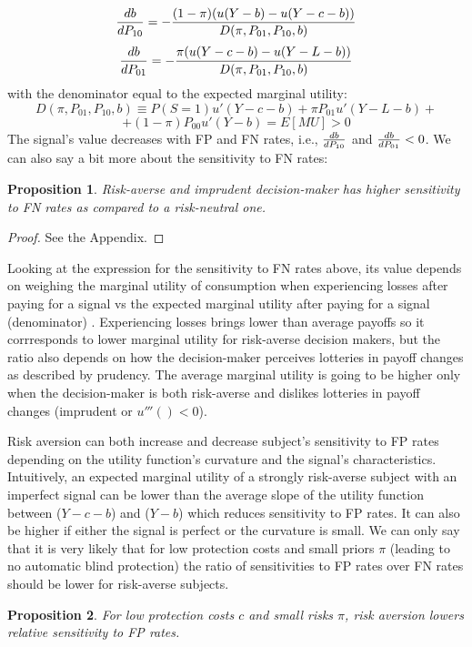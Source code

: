 \documentclass[12pt,a4paper]{article}
\newtheorem{theorem}{Proposition}
\begin{document}
$${db\over dP_{10}}=-{(1-\pi)(u(Y-b)-u(Y-c-b))\over D(\pi, P_{01}, P_{10}, b)}$$
$${db\over dP_{01}}=-{\pi(u(Y-c-b)-u(Y-L-b))\over D(\pi, P_{01}, P_{10}, b)}$$
with the denominator equal to the expected marginal utility:
$$D(\pi, P_{01}, P_{10}, b)\equiv P(S=1)u'(Y-c-b)+\pi P_{01}u'(Y-L-b)+$$
$$+(1-\pi)P_{00}u'(Y-b)=E[MU]>0$$
The signal's value decreases with FP and FN rates, i.e., ${db\over dP_{10}}$ and ${db\over dP_{01}}<0$. We can also say a bit more about the sensitivity to FN rates:
\begin{theorem}
Risk-averse and imprudent decision-maker has higher sensitivity to FN rates as compared to a risk-neutral one.
\end{theorem}\label{thm:riskAverse}  
\begin{proof}
See the Appendix.
\end{proof}
Looking at the expression for the sensitivity to FN rates above, its value depends on weighing the marginal utility of consumption when experiencing losses after paying for a signal vs the expected marginal utility after paying for a signal (denominator) . Experiencing losses brings lower than average payoffs so it corrresponds to lower marginal utility for risk-averse decision makers, but the ratio also depends on how the decision-maker perceives lotteries in payoff changes as described by prudency. The average marginal utility is going to be higher only when the decision-maker is both risk-averse and dislikes lotteries in payoff changes (imprudent or $u'''()<0$). 

Risk aversion can both increase and decrease subject's sensitivity to FP rates depending on the utility function's curvature and the signal's characteristics. Intuitively, an expected marginal utility of a strongly risk-averse subject with an imperfect signal can be lower than the average slope of the utility function between ($Y-c-b$) and ($Y-b$) which reduces sensitivity to FP rates. It can also be higher if either the signal is perfect or the curvature is small. We can only say that it is very likely that for low protection costs and small priors $\pi$ (leading to no automatic blind protection) the ratio of sensitivities to FP rates over FN rates should be lower for risk-averse subjects. 

\begin{theorem}
For low protection costs $c$ and small risks $\pi$, risk aversion lowers relative sensitivity to FP rates. 
\end{theorem}\label{thm:riskAverse2}  
\end{document}
